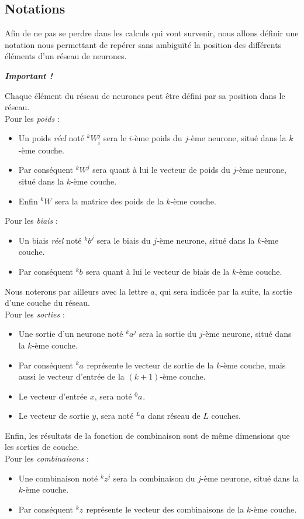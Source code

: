 \documentclass[10pt,a4paper]{report}
\newcommand{\lexp}[1]{\phantom{}^{#1}}
\newcommand{\elem}[4]{\lexp{#2}#1^{#3}_{#4}}
\begin{document}
		\subsection{Notations}
		Afin de ne pas se perdre dans les calculs qui vont survenir, nous allons définir une notation nous permettant de repérer sans ambiguïté la position des différents éléments d'un réseau de neurones.
		\begin{center}
		\emph{\textbf{Important !}}
		\end{center}
		Chaque élément du réseau de neurones peut être défini par sa position dans le réseau.\\
		Pour les \emph{poids} :
		\begin{itemize}
			\item Un poids \emph{réel} noté $\elem{W}{k}{j}{i}$ sera le $i$-ème poids du $j$-ème neurone, situé dans la $k$-ème couche.
			\item Par conséquent $\elem{W}{k}{j}{}$ sera quant à lui le vecteur de poids du $j$-ème neurone, situé dans la $k$-ème couche.
			\item Enfin $\elem{W}{k}{}{}$ sera la matrice des poids de la $k$-ème couche.\\
		\end{itemize}
		Pour les \emph{biais} :
		\begin{itemize}
			\item Un biais \emph{réel} noté $\elem{b}{k}{j}{}$ sera le biais du $j$-ème neurone, situé dans la $k$-ème couche.
			\item Par conséquent $\elem{b}{k}{}{}$ sera quant à lui le vecteur de biais de la $k$-ème couche.\\
		\end{itemize}
		Nous noterons par ailleurs avec la lettre $a$, qui sera indicée par la suite, la sortie d'une couche du réseau.\\
		Pour les \emph{sorties} :
		\begin{itemize}
			\item Une sortie d'un neurone noté $\elem{a}{k}{j}{}$ sera la sortie du $j$-ème neurone, situé dans la $k$-ème couche.
			\item Par conséquent $\elem{a}{k}{}{}$ représente le vecteur de sortie de la $k$-ème couche, mais aussi le vecteur d'entrée de la $(k+1)$-ème couche.
			\item Le vecteur d'entrée $x$, sera noté $\elem{a}{0}{}{}$.
			\item Le vecteur de sortie $y$, sera noté $\elem{a}{L}{}{}$ dans réseau de $L$ couches.\\
		\end{itemize}
		Enfin, les résultats de la fonction de combinaison sont de même dimensions que les sorties de couche.\\
		Pour les \emph{combinaisons} :
		\begin{itemize}
			\item Une combinaison noté $\elem{z}{k}{j}{}$ sera la combinaison du $j$-ème neurone, situé dans la $k$-ème couche.
			\item Par conséquent $\elem{z}{k}{}{}$ représente le vecteur des combinaisons de la $k$-ème couche.\\
		\end{itemize}
			
\end{document}
